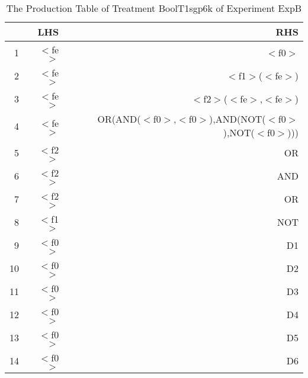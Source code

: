 \begin{table}[ht]
\centering
\begin{tabular}{rrr}
  \hline
 & LHS & RHS \\ 
  \hline
1 & $<$fe$>$ & $<$f0$>$ \\ 
  2 & $<$fe$>$ & $<$f1$>$($<$fe$>$) \\ 
  3 & $<$fe$>$ & $<$f2$>$($<$fe$>$,$<$fe$>$) \\ 
  4 & $<$fe$>$ & OR(AND($<$f0$>$,$<$f0$>$),AND(NOT($<$f0$>$),NOT($<$f0$>$))) \\ 
  5 & $<$f2$>$ & OR \\ 
  6 & $<$f2$>$ & AND \\ 
  7 & $<$f2$>$ & OR \\ 
  8 & $<$f1$>$ & NOT \\ 
  9 & $<$f0$>$ & D1 \\ 
  10 & $<$f0$>$ & D2 \\ 
  11 & $<$f0$>$ & D3 \\ 
  12 & $<$f0$>$ & D4 \\ 
  13 & $<$f0$>$ & D5 \\ 
  14 & $<$f0$>$ & D6 \\ 
   \hline
\end{tabular}
\caption{The Production Table of Treatment BoolT1sgp6k of Experiment ExpB} 
\end{table}
